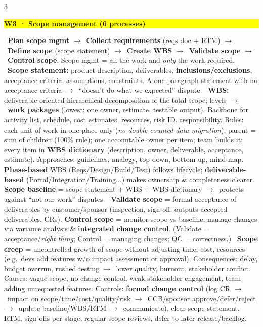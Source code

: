 \documentclass[a4paper,landscape]{article}
\newcommand{\hlhighlight}[1]{\begingroup\setlength{\fboxsep}{0pt}\colorbox{yellow}{\strut\textbf{#1}}\endgroup}
\newcommand{\concept}[1]{\textbf{#1}}
\newcommand{\lbl}[1]{\textbf{#1}}
\newcommand{\kh}[1]{{\setlength{\fboxsep}{0.5pt}\colorbox{keyhlcolor}{#1}}}
\newcommand{\ra}{$\rightarrow$}
\begin{document}
\begin{multicols}{3}
\par\smallskip\noindent\hlhighlight{W3 · Scope management (6 processes)}\ \concept{Plan scope mgmt} \ra\ \concept{Collect requirements} (reqs doc + RTM) \ra\ \concept{Define scope} (scope statement) \ra\ \concept{Create WBS} \ra\ \concept{Validate scope} \ra\ \concept{Control scope}. Scope mgmt = all the work and \emph{only} the work required. \textbullet\ \concept{Scope statement:} product description, deliverables, \lbl{inclusions/exclusions}, acceptance criteria, assumptions, constraints. A one-paragraph statement with no acceptance criteria \ra\ ``doesn't do what we expected'' dispute. \textbullet\ \concept{WBS:} \kh{deliverable-oriented hierarchical decomposition} of the total scope; levels \ra\ \lbl{work packages} (lowest; one owner, estimate, testable output). Backbone for activity list, schedule, cost estimates, resources, risk ID, responsibility. Rules: each unit of work in one place only (\emph{no double-counted data migration}); parent = sum of children (100\% rule); one accountable owner per item; team builds it; every item in \lbl{WBS dictionary} (description, owner, deliverable, acceptance, estimate). Approaches: guidelines, analogy, top-down, bottom-up, mind-map. \lbl{Phase-based} WBS (Reqs/Design/Build/Test) follows lifecycle; \lbl{deliverable-based} (Portal/Integration/Training...) makes ownership \& completeness clearer. \concept{Scope baseline} = scope statement + WBS + WBS dictionary \ra\ protects against ``not our work'' disputes. \textbullet\ \concept{Validate scope} = \kh{formal acceptance of deliverables by customer/sponsor} (inspection, sign-off; outputs accepted deliverables, CRs). \concept{Control scope} = monitor scope vs baseline, manage changes via variance analysis \& \lbl{integrated change control}. (Validate = acceptance/\emph{right thing}; Control = managing changes; QC = correctness.) \textbullet\ \concept{Scope creep} = \kh{uncontrolled growth of scope} without adjusting time, cost, resources (e.g.\ devs add features w/o impact assessment or approval). Consequences: delay, budget overrun, rushed testing \ra\ lower quality, burnout, stakeholder conflict. Causes: vague scope, no change control, weak stakeholder engagement, team adding unrequested features. Controls: \lbl{formal change control} (log CR \ra\ impact on scope/time/cost/quality/risk \ra\ CCB/sponsor approve/defer/reject \ra\ update baseline/WBS/RTM \ra\ communicate), clear scope statement, RTM, sign-offs per stage, regular scope reviews, defer to later release/backlog.\par


\end{multicols}
\end{document}
